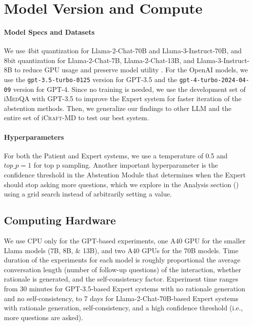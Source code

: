 \section{Model Version and Compute}\label{app:model_details}

\paragraph{Model Specs and Datasets} We use 4bit quantization for Llama-2-Chat-70B and Llama-3-Instruct-70B, and 8bit quantization for Llama-2-Chat-7B, Llama-2-Chat-13B, and Llama-3-Instruct-8B to reduce GPU usage and preserve model utility \citep{huang2024good}.
For the OpenAI models, we use the \texttt{gpt-3.5-turbo-0125} version for GPT-3.5 and the \texttt{gpt-4-turbo-2024-04-09} version for GPT-4. Since no training is needed, we use the development set of i\textsc{MedQA} with GPT-3.5 to improve the Expert system for faster iteration of the abstention methods.
Then, we generalize our findings to other LLM and the entire set of i\textsc{Craft-MD} to test our best system.

\paragraph{Hyperparameters}
For both the Patient and Expert systems, we use a temperature of 0.5 and $top\_p = 1$ for top p sampling. Another important hyperparameter is the confidence threshold in the Abstention Module that determines when the Expert should stop asking more questions, which we explore in the Analysis section () using a grid search instead of arbitrarily setting a value.

\subsection{Computing Hardware}
We use CPU only for the GPT-based experiments, one A40 GPU for the smaller Llama models (7B, 8B, \& 13B), and two A40 GPUs for the 70B models. Time duration of the experiments for each model is roughly proportional the average conversation length (number of follow-up questions) of the interaction, whether rationale is generated, and the self-consistency factor. Experiment time ranges from 30 minutes for GPT-3.5-based Expert systems with no rationale generation and no self-consistency, to 7 days for Llama-2-Chat-70B-based Expert systems with rationale generation, self-consistency, and a high confidence threshold (i.e., more questions are asked).

